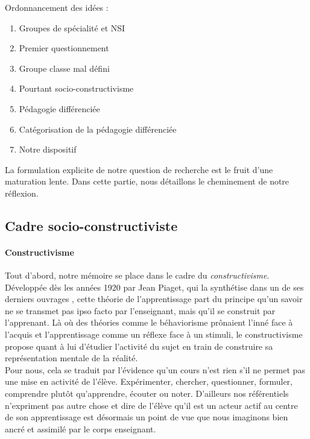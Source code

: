 Ordonnancement des idées :
\begin{enumerate}
	\item Groupes de spécialité et NSI
	\item Premier questionnement
	\item Groupe classe mal défini
	\item Pourtant socio-constructivisme
	\item Pédagogie différenciée
	\item Catégorisation de la pédagogie différenciée
	\item Notre dispositif
\end{enumerate}



La formulation explicite de notre question de recherche est le fruit d'une maturation lente. Dans cette partie, nous détaillons le cheminement de notre réflexion.


\subsection{Cadre socio-constructiviste}


\paragraph{Constructivisme}
Tout d'abord, notre mémoire se place dans le cadre du \emph{constructivisme}.
%
%
Développée dès les années 1920 par Jean Piaget, qui la synthétise dans un de ses derniers ouvrages \citep{piaget_prise_1974}, cette théorie de l'apprentissage part du principe qu'un savoir ne se transmet pas ipso facto par l'enseignant, mais qu'il se construit par l'apprenant. Là où des théories comme le béhaviorisme prônaient l'inné face à l'acquis et l'apprentissage comme un réflexe face à un stimuli, le constructivisme propose quant à lui d'étudier l'activité du sujet en train de construire sa représentation mentale de la réalité. 
\\
Pour nous, cela se traduit par l'évidence qu'un cours n'est rien s'il ne permet pas une mise en activité de l'élève. Expérimenter, chercher, questionner, formuler, comprendre plutôt qu'apprendre, écouter ou noter.
%
D'ailleurs nos référentiels n'expriment pas autre chose et dire de l'élève qu'il est un acteur actif au centre de son apprentissage est désormais un point de vue que nous imaginons bien ancré et assimilé par le corps enseignant.



